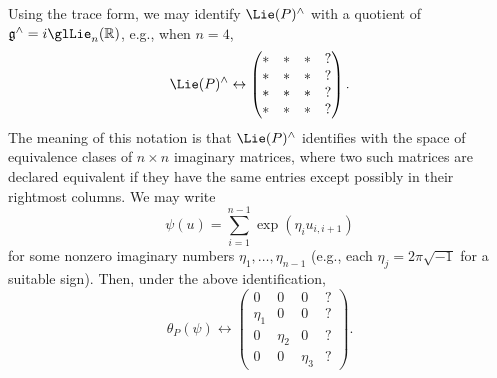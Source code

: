 Using the trace form, we may identify $\Lie(P)^\wedge$ with a quotient of $\mathfrak{g}^\wedge = i \glLie_n(\mathbb{R})$, e.g., when $n=4$,
\begin{equation*}
  \Lie(P)^\wedge \leftrightarrow
  \begin{pmatrix}
    \ast & \ast & \ast & ? \\
    \ast & \ast & \ast & ? \\
    \ast & \ast & \ast & ? \\
    \ast & \ast & \ast & ?
  \end{pmatrix}.
\end{equation*}
The meaning of this notation is that $\Lie(P)^\wedge$ identifies with the space of equivalence clases of $n \times n$ imaginary matrices, where two such matrices are declared equivalent if they have the same entries except possibly in their rightmost columns.  We may write
\begin{equation}\label{eq:psiu-=-sum_i=1n}
  \psi(u) = \sum_{i=1}^{n-1} \exp(\eta_i u_{i,i+1})
\end{equation}
for some nonzero imaginary numbers $\eta_1,\dotsc,\eta_{n-1}$ (e.g., each $\eta_j = 2 \pi \sqrt{-1}$ for a suitable sign).  Then, under the above identification,
\begin{equation}\label{eq:theta-leftr-beginpm}
  \theta_P(\psi)
  \leftrightarrow
  \begin{pmatrix}
    0 & 0 & 0 & ? \\
    \eta_1  & 0 & 0 & ? \\
    0 & \eta_2  & 0 & ? \\
    0 & 0 & \eta_3  & ?
  \end{pmatrix}.
\end{equation}

